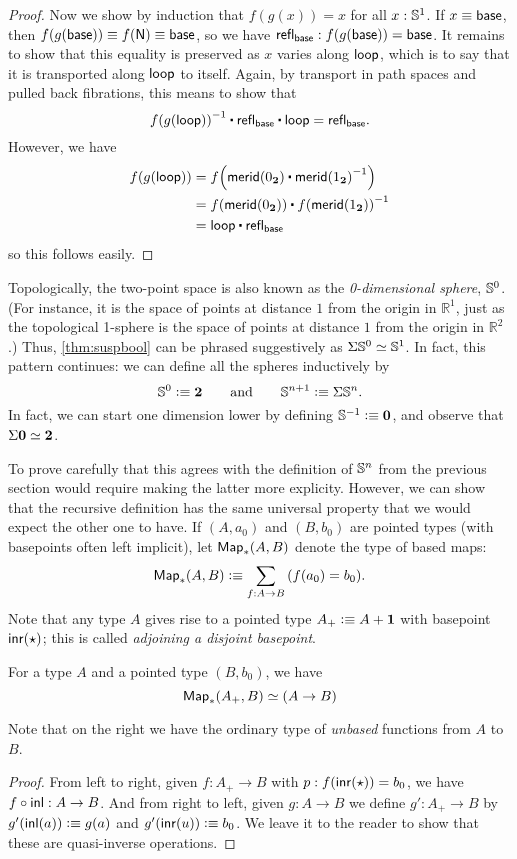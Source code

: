 \begin{proof}
  Now we show by induction that $f(g(x))=x$ for all $x:\mathbb{S}^1$.
  If $x\equiv \mathsf{base}$, then $f(g(\mathsf{base}))\equiv f(\mathsf{N})\equiv\mathsf{base}$, so we have $\mathsf{refl}_{\mathsf{base}} : f(g(\mathsf{base}))=\mathsf{base}$.
  It remains to show that this equality is preserved as $x$ varies along $\mathsf{loop}$, which is to say that it is transported along $\mathsf{loop}$ to itself.
  Again, by transport in path spaces and pulled back fibrations, this means to show that
  \[ \opp{\ap f {\ap g {\lloop}}} \ct \refl{\base} \ct \lloop = \refl{\base}.\]
  However, we have
  \begin{align*}
    \ap f {\ap g {\lloop}} &= \ap f {\merid(\bfalse) \ct \opp{\merid(\btrue)}}\\
    &= \ap f {\merid(\bfalse)} \ct \opp{\ap f {\merid(\btrue)}}\\
    &= \lloop \ct \refl{\base}
  \end{align*}
  so this follows easily.
\end{proof}

Topologically, the two-point space \bool is also known as the \emph{0-dimensional sphere}, $\mathbb{S}^0$.
(For instance, it is the space of points at distance $1$ from the origin in $\mathbb{R}^1$, just as the topological 1-sphere is the space of points at distance $1$ from the origin in $\mathbb{R}^2$.)
Thus, \autoref{thm:suspbool} can be phrased suggestively as $\Sigma\mathbb{S}^0 \simeq \mathbb{S}^1$.
In fact, this pattern continues: we can define all the spheres inductively by
\begin{equation}\label{eq:Snsusp}
  \Sn^0 \defeq \bool
  \qquad\text{and}\qquad
  \Sn^{n+1} \defeq \susp \Sn^n.
\end{equation}
In fact, we can start one dimension lower by defining $\mathbb{S}^{-1}\vcentcolon\equiv \mathbf{0}$, and observe that $\Sigma\mathbf{0} \simeq \mathbf{2}$.

To prove carefully that this agrees with the definition of $\mathbb{S}^n$ from the previous section would require making the latter more explicity.
However, we can show that the recursive definition has the same universal property that we would expect the other one to have.
If $(A,a_0)$ and $(B,b_0)$ are pointed types (with basepoints often left implicit), let $\mathsf{Map}_*(A,B)$ denote the type of based maps:
\[ \Map_*(A,B) \defeq \sm{f:A\to B} (f(a_0)=b_0). \]
Note that any type $A$ gives rise to a pointed type $A_+ \vcentcolon\equiv A+\mathbf{1}$ with basepoint ${\mathsf{inr}}(\star)$; this is called \emph{adjoining a disjoint basepoint}.

\begin{lem}
  For a type $A$ and a pointed type $(B,b_0)$, we have
  \[ \mathsf{Map}_*(A_+,B) \simeq (A\to B) \]
\end{lem}
Note that on the right we have the ordinary type of \emph{unbased} functions from $A$ to $B$.
\begin{proof}
  From left to right, given $f:A_+ \to B$ with $p:f({\mathsf{inr}}(\star)) = b_0$, we have $f\circ {\mathsf{inl}} : A \to B$.
  And from right to left, given $g:A\to B$ we define $g':A_+ \to B$ by $g'({\mathsf{inl}}(a))\vcentcolon\equiv g(a)$ and $g'({\mathsf{inr}}(u)) \vcentcolon\equiv b_0$.
  We leave it to the reader to show that these are quasi-inverse operations.
\end{proof}

